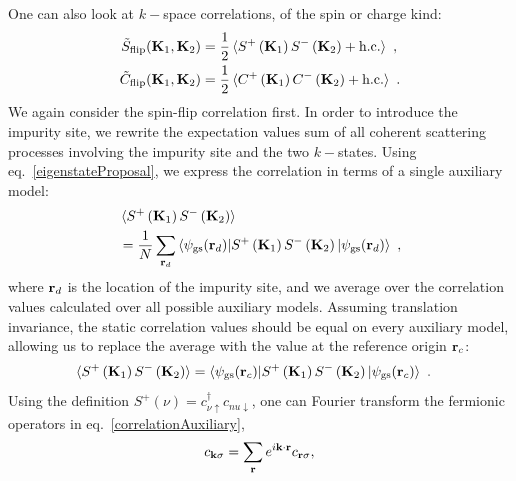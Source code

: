 \documentclass[reprint,hidelinks]{revtex4-2}
\begin{document}
One can also look at \(k-\)space correlations, of the spin or charge kind:
\begin{equation}\begin{aligned}
	\tilde{S}_\text{flip}({\bf K}_1, {\bf K}_2) &= \frac{1}{2}\braket{S^+\left({\bf K}_1\right)S^-\left({\bf K}_2\right) + \text{h.c.}}~,\\
	\tilde{C}_\text{flip}({\bf K}_1, {\bf K}_2) &= \frac{1}{2}\braket{C^+\left({\bf K}_1\right)C^-\left({\bf K}_2\right) + \text{h.c.}}~.
\end{aligned}\end{equation}
We again consider the spin-flip correlation first. In order to introduce the impurity site, we rewrite the expectation values sum of all coherent scattering processes involving the impurity site and the two \(k-\)states. Using eq.~\ref{eigenstateProposal}, we express the correlation in terms of a single auxiliary model:
\begin{equation}\begin{aligned}
	&\braket{S^+\left({\bf K}_1\right)S^-\left({\bf K}_2\right)} \\
	&= \frac{1}{N}\sum_{{\bf r}_d}\braket{\psi_\text{gs}({\bf r}_d) | S^+\left({\bf K}_1\right)S^-\left({\bf K}_2\right) | \psi_\text{gs}({\bf r}_d)}~,
\end{aligned}\end{equation}
where \({\bf r}_d\) is the location of the impurity site, and we average over the correlation values calculated over all possible auxiliary models. Assuming translation invariance, the static correlation values should be equal on every auxiliary model, allowing us to replace the average with the value at the reference origin \({\bf r}_c\):
\begin{equation}\begin{aligned}\label{correlationAuxiliary}
	&\braket{S^+\left({\bf K}_1\right)S^-\left({\bf K}_2\right)} = \braket{\psi_\text{gs}({\bf r}_c) | S^+\left({\bf K}_1\right)S^-\left({\bf K}_2\right) | \psi_\text{gs}({\bf r}_c)}~.
\end{aligned}\end{equation}
Using the definition \(S^+(\nu) = c^\dagger_{\nu \uparrow} c_{nu \downarrow}\), one can Fourier transform the fermionic operators in eq.~\ref{correlationAuxiliary},
\begin{equation}\begin{aligned}
	c_{{\bf k}\sigma} = \sum_{\bf r} e^{i {\bf k}\cdot{\bf r}} c_{{\bf r}\sigma},
\end{aligned}\end{equation}
\end{document}
